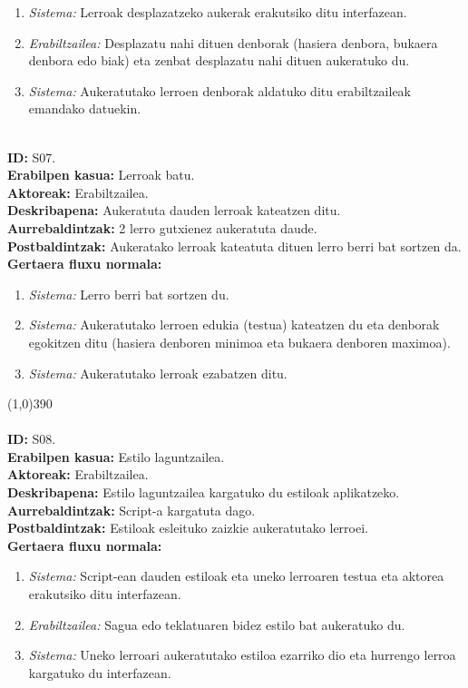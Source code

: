 \begin{enumerate}
	\item \textit{Sistema:} Lerroak desplazatzeko aukerak erakutsiko ditu interfazean.
	\item \textit{Erabiltzailea:} Desplazatu nahi dituen denborak (hasiera denbora, bukaera denbora edo biak) eta zenbat desplazatu nahi dituen aukeratuko du.
	\item \textit{Sistema:} Aukeratutako lerroen denborak aldatuko ditu erabiltzaileak emandako datuekin.
\end{enumerate}
\noindent\\
\textbf{ID:} S07.\\
\textbf{Erabilpen kasua:} Lerroak batu.\\
\textbf{Aktoreak:} Erabiltzailea.\\
\textbf{Deskribapena:} Aukeratuta dauden lerroak kateatzen ditu.\\
\textbf{Aurrebaldintzak:} 2 lerro gutxienez aukeratuta daude.\\
\textbf{Postbaldintzak:} Aukeratako lerroak kateatuta dituen lerro berri bat sortzen da.\\
\textbf{Gertaera fluxu normala:}
\begin{enumerate}
	\item \textit{Sistema:} Lerro berri bat sortzen du.
	\item \textit{Sistema:} Aukeratutako lerroen edukia (testua) kateatzen du eta denborak egokitzen ditu (hasiera denboren minimoa eta bukaera denboren maximoa).
	\item \textit{Sistema:} Aukeratutako lerroak ezabatzen ditu.
\end{enumerate}
\line(1,0){390}\\
\noindent\\
\textbf{ID:} S08.\\
\textbf{Erabilpen kasua:} Estilo laguntzailea.\\
\textbf{Aktoreak:} Erabiltzailea.\\
\textbf{Deskribapena:} Estilo laguntzailea kargatuko du estiloak aplikatzeko.\\
\textbf{Aurrebaldintzak:} Script-a kargatuta dago.\\
\textbf{Postbaldintzak:} Estiloak esleituko zaizkie aukeratutako lerroei.\\
\textbf{Gertaera fluxu normala:}
\begin{enumerate}
	\item \textit{Sistema:} Script-ean dauden estiloak eta uneko lerroaren testua eta aktorea erakutsiko ditu interfazean.
	\item \textit{Erabiltzailea:} Sagua edo teklatuaren bidez estilo bat aukeratuko du.
	\item \textit{Sistema:} Uneko lerroari aukeratutako estiloa ezarriko dio eta hurrengo lerroa kargatuko du interfazean.
\end{enumerate}
